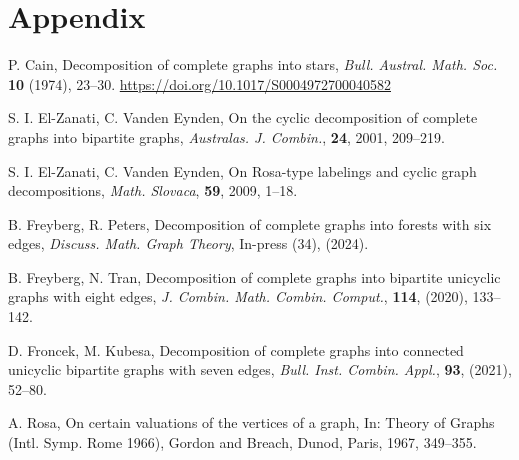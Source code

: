 \chapter{Appendix} \label{chap:Appendix}


\newpage

\newpage
    
    

    \begin{thebibliography}{20}
    
    P. Cain, 
    Decomposition of complete graphs into stars, 
    \textit{Bull. Austral. Math. Soc.} \textbf{10} (1974), 23--30.
    \url{https://doi.org/10.1017/S0004972700040582}
    
    S. I. El-Zanati, C. Vanden Eynden,
    On the cyclic decomposition of complete graphs into bipartite graphs,
    \textit{Australas. J. Combin.}, \textbf{24}, 2001, 209--219.
    
    S. I. El-Zanati, C. Vanden Eynden,
    On Rosa-type labelings and cyclic graph decompositions,
    \textit{Math. Slovaca}, \textbf{59}, 2009, 1--18.
    
    B. Freyberg, R. Peters, 
    Decomposition of complete graphs into forests with six edges, 
    \textit{Discuss. Math. Graph Theory}, In-press (34), (2024).
    
    B. Freyberg, N. Tran, 
    Decomposition of complete graphs into bipartite unicyclic graphs with eight edges, 
    \textit{J. Combin. Math. Combin. Comput.}, \textbf{114}, (2020), 133--142.
    
    D. Froncek, M. Kubesa, 
    Decomposition of complete graphs into connected unicyclic bipartite graphs with seven edges,
    \textit{Bull. Inst. Combin. Appl.}, \textbf{93}, (2021), 52--80.
    
    A. Rosa,
    On certain valuations of the vertices of a graph,
    In: Theory of Graphs (Intl. Symp. Rome 1966), Gordon and Breach, Dunod, Paris,
    1967, 349--355.
    
    \end{thebibliography}